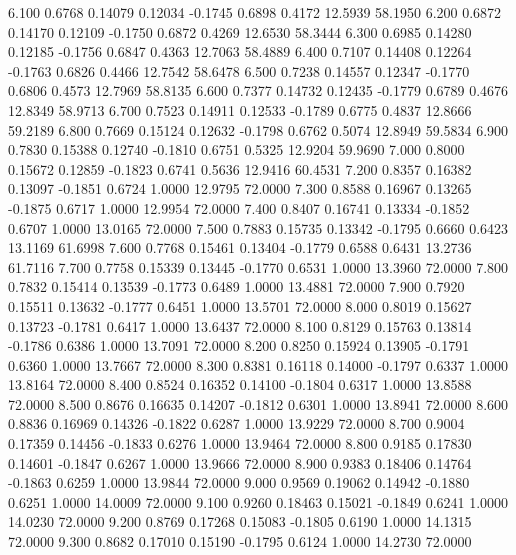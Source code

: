    6.100   0.6768   0.14079   0.12034  -0.1745   0.6898   0.4172  12.5939  58.1950
   6.200   0.6872   0.14170   0.12109  -0.1750   0.6872   0.4269  12.6530  58.3444
   6.300   0.6985   0.14280   0.12185  -0.1756   0.6847   0.4363  12.7063  58.4889
   6.400   0.7107   0.14408   0.12264  -0.1763   0.6826   0.4466  12.7542  58.6478
   6.500   0.7238   0.14557   0.12347  -0.1770   0.6806   0.4573  12.7969  58.8135
   6.600   0.7377   0.14732   0.12435  -0.1779   0.6789   0.4676  12.8349  58.9713
   6.700   0.7523   0.14911   0.12533  -0.1789   0.6775   0.4837  12.8666  59.2189
   6.800   0.7669   0.15124   0.12632  -0.1798   0.6762   0.5074  12.8949  59.5834
   6.900   0.7830   0.15388   0.12740  -0.1810   0.6751   0.5325  12.9204  59.9690
   7.000   0.8000   0.15672   0.12859  -0.1823   0.6741   0.5636  12.9416  60.4531
   7.200   0.8357   0.16382   0.13097  -0.1851   0.6724   1.0000  12.9795  72.0000
   7.300   0.8588   0.16967   0.13265  -0.1875   0.6717   1.0000  12.9954  72.0000
   7.400   0.8407   0.16741   0.13334  -0.1852   0.6707   1.0000  13.0165  72.0000
   7.500   0.7883   0.15735   0.13342  -0.1795   0.6660   0.6423  13.1169  61.6998
   7.600   0.7768   0.15461   0.13404  -0.1779   0.6588   0.6431  13.2736  61.7116
   7.700   0.7758   0.15339   0.13445  -0.1770   0.6531   1.0000  13.3960  72.0000
   7.800   0.7832   0.15414   0.13539  -0.1773   0.6489   1.0000  13.4881  72.0000
   7.900   0.7920   0.15511   0.13632  -0.1777   0.6451   1.0000  13.5701  72.0000
   8.000   0.8019   0.15627   0.13723  -0.1781   0.6417   1.0000  13.6437  72.0000
   8.100   0.8129   0.15763   0.13814  -0.1786   0.6386   1.0000  13.7091  72.0000
   8.200   0.8250   0.15924   0.13905  -0.1791   0.6360   1.0000  13.7667  72.0000
   8.300   0.8381   0.16118   0.14000  -0.1797   0.6337   1.0000  13.8164  72.0000
   8.400   0.8524   0.16352   0.14100  -0.1804   0.6317   1.0000  13.8588  72.0000
   8.500   0.8676   0.16635   0.14207  -0.1812   0.6301   1.0000  13.8941  72.0000
   8.600   0.8836   0.16969   0.14326  -0.1822   0.6287   1.0000  13.9229  72.0000
   8.700   0.9004   0.17359   0.14456  -0.1833   0.6276   1.0000  13.9464  72.0000
   8.800   0.9185   0.17830   0.14601  -0.1847   0.6267   1.0000  13.9666  72.0000
   8.900   0.9383   0.18406   0.14764  -0.1863   0.6259   1.0000  13.9844  72.0000
   9.000   0.9569   0.19062   0.14942  -0.1880   0.6251   1.0000  14.0009  72.0000
   9.100   0.9260   0.18463   0.15021  -0.1849   0.6241   1.0000  14.0230  72.0000
   9.200   0.8769   0.17268   0.15083  -0.1805   0.6190   1.0000  14.1315  72.0000
   9.300   0.8682   0.17010   0.15190  -0.1795   0.6124   1.0000  14.2730  72.0000
